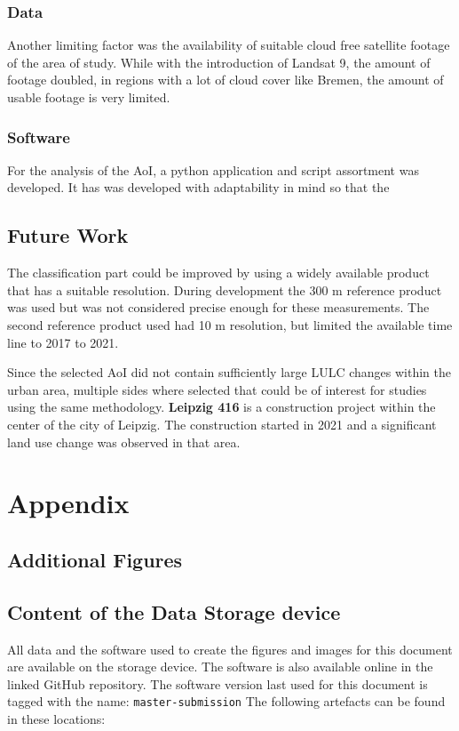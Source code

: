 \documentclass[12pt,a4paper, english,twoside]{article}
\begin{document}
\subsubsection{Data}
Another limiting factor was the availability of suitable cloud free satellite footage of the area of study.
While with the introduction of Landsat 9, the amount of footage doubled, in regions with a lot of cloud cover like Bremen, the amount of usable footage is very limited.

\subsubsection{Software}
For the analysis of the \gls{AoI}, a python application and script assortment was developed. 
It has was developed with adaptability in mind so that the 


% 
\subsection{Future Work}

The classification part could be improved by using a widely available product that has a suitable resolution. 
During development the 300 m reference product~\cite{sec:references} was used but was not considered precise enough for these measurements.
The second reference product used had 10 m resolution, but limited the available time line to 2017 to 2021.

Since the selected \gls{AoI} did not contain sufficiently large \gls{LULC} changes within the urban area, multiple sides where selected that could be of interest for studies using the same methodology.
\textbf{Leipzig 416} is a construction project within the center of the city of Leipzig.
The construction started in 2021 and a significant land use change was observed in that area. 





\newpage
\section{Appendix}
  \subsection{Additional Figures}
  \subsection{Content of the Data Storage device}
    All data and the software used to create the figures and images for this document are available on the storage device.
    The software is also available online in the linked GitHub repository.
    The software version last used for this document is tagged with the name: \texttt{master-submission}
    The following artefacts can be found in these locations:
\end{document}
